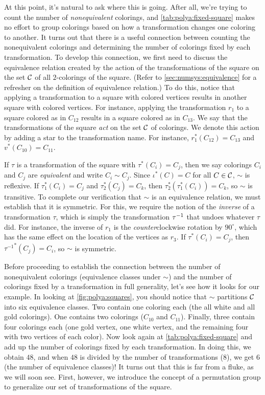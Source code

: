 At this point, it's natural to ask where this is going. After all,
we're trying to count the number of \emph{nonequivalent} colorings,
and \autoref{tab:polya:fixed-square} makes no effort to group
colorings based on how a transformation changes one coloring to
another. It turns out that there is a useful connection between
counting the nonequivalent colorings and determining the number of
colorings fixed by each transformation. To develop this connection, we
first need to discuss the equivalence relation created by the action
of the transformations of the square on the set $\mathcal{C}$ of all
$2$-colorings of the square. (Refer to
\autoref{sec:numsys:equivalence} for a refresher on the definition of
equivalence relation.) To do this, notice that applying a
transformation to a square with colored vertices results in another
square with colored vertices. For instance, applying the
transformation $r_1$ to a square colored as in $C_{12}$ results in a
square colored as in $C_{13}$. We say that the transformations of the
square \emph{act} on the set $\mathcal{C}$ of colorings. We denote this
action by adding a star to the transformation name. For instance,
$r_1^*(C_{12})=C_{13}$ and $v^*(C_{10})=C_{11}$.

If $\tau$ is a transformation of the square with $\tau^*(C_i) = C_j$,
then we say colorings $C_i$ and $C_j$ are \emph{equivalent} and write
$C_i\sim C_j$. Since $\iota^*(C)=C$ for all $C\in\mathcal{C}$, $\sim$ is
reflexive. If $\tau_1^*(C_i) = C_j$ and $\tau_2^*(C_j) = C_k$, then
$\tau_2^*(\tau_1^*(C_i)) = C_k$, so $\sim$ is transitive. To complete
our verification that $\sim$ is an equivalence relation, we must
establish that it is symmetric. For this, we require the notion of the
\emph{inverse} of a transformation $\tau$, which is simply the
transformation $\tau^{-1}$ that undoes whatever $\tau$ did. For
instance, the inverse of $r_1$ is the \emph{counter}clockwise rotation
by $90^\circ$, which has the same effect on the location of the
vertices as $r_3$. If $\tau^*(C_i) = C_j$, then ${\tau^{-1}}^*(C_j) =
C_i$, so $\sim$ is symmetric. 

Before proceeding to establish the connection between the number of
nonequivalent colorings (equivalence classes under $\sim$) and the
number of colorings fixed by a transformation in full generality,
let's see how it looks for our example. In looking at
\autoref{fig:polya:squares}, you should notice that $\sim$ partitions
$\mathcal{C}$ into six equivalence classes. Two contain one coloring each
(the all white and all gold colorings). One contains two colorings
($C_{10}$ and $C_{11}$). Finally, three contain four colorings each
(one gold vertex, one white vertex, and the remaining four with two
vertices of each color). Now look again at
\autoref{tab:polya:fixed-square} and add up the number of colorings
fixed by each transformation. In doing this, we obtain $48$, and when
$48$ is divided by the number of transformations ($8$), we get $6$
(the number of equivalence classes)! It turns out that this is far
from a fluke, as we will soon see. First, however, we introduce the
concept of a permutation group to generalize our set of
transformations of the square.

